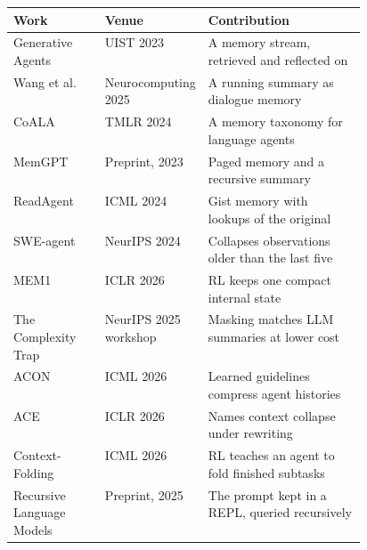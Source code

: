 \begin{center}\footnotesize
\begin{tabularx}{\linewidth}{L{0.26\linewidth}L{0.2\linewidth}X}
\toprule
\textbf{Work} & \textbf{Venue} & \textbf{Contribution} \\
\midrule
Generative Agents & UIST 2023 & A memory stream, retrieved and reflected on \\
Wang et al. & Neurocomputing 2025 & A running summary as dialogue memory \\
CoALA & TMLR 2024 & A memory taxonomy for language agents \\
MemGPT & Preprint, 2023 & Paged memory and a recursive summary \\
ReadAgent & ICML 2024 & Gist memory with lookups of the original \\
SWE-agent & NeurIPS 2024 & Collapses observations older than the last five \\
MEM1 & ICLR 2026 & RL keeps one compact internal state \\
The Complexity Trap & NeurIPS 2025 workshop & Masking matches LLM summaries at lower cost \\
ACON & ICML 2026 & Learned guidelines compress agent histories \\
ACE & ICLR 2026 & Names context collapse under rewriting \\
Context-Folding & ICML 2026 & RL teaches an agent to fold finished subtasks \\
Recursive Language Models & Preprint, 2025 & The prompt kept in a REPL, queried recursively \\
\bottomrule
\end{tabularx}
\end{center}

